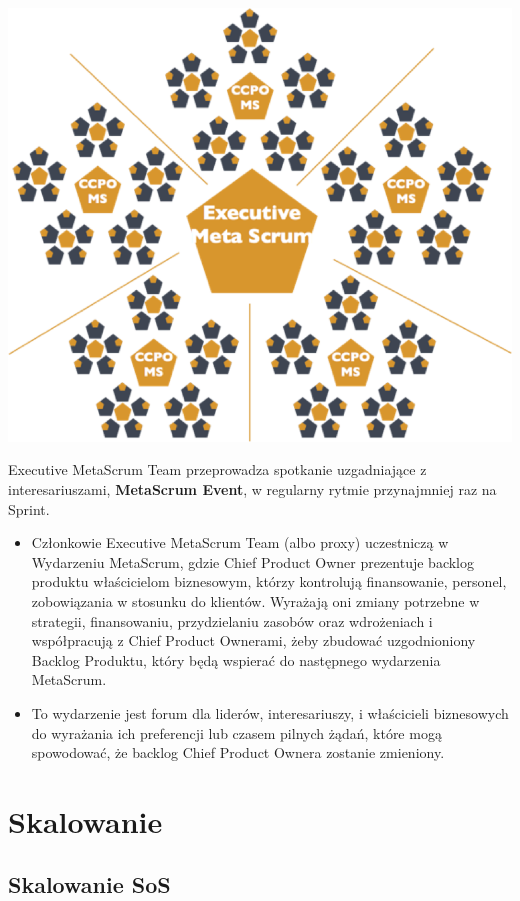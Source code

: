 \documentclass[12pt,a4paper,parskip=full]{scrartcl}
\begin{document}
\includegraphics[width=1.0\linewidth]{ExecMetaScrum.png}

Executive MetaScrum Team przeprowadza spotkanie uzgadniające z interesariuszami, \textbf{MetaScrum Event}, w regularny rytmie przynajmniej raz na Sprint.

\begin{itemize}
	\item Członkowie Executive MetaScrum Team (albo proxy) uczestniczą w Wydarzeniu MetaScrum, gdzie Chief Product Owner prezentuje backlog produktu właścicielom biznesowym, którzy kontrolują finansowanie, personel, zobowiązania w stosunku do klientów. Wyrażają oni zmiany potrzebne w strategii, finansowaniu, przydzielaniu zasobów oraz wdrożeniach i współpracują z Chief Product Ownerami, żeby zbudować uzgodnioniony Backlog Produktu, który będą wspierać do następnego wydarzenia MetaScrum.
	\item To wydarzenie jest forum dla  liderów, interesariuszy, i właścicieli biznesowych do wyrażania ich preferencji lub czasem pilnych żądań, które mogą spowodować, że backlog Chief Product Ownera zostanie zmieniony.
\end{itemize}

\section{Skalowanie}

\subsection{Skalowanie SoS}
\end{document}

